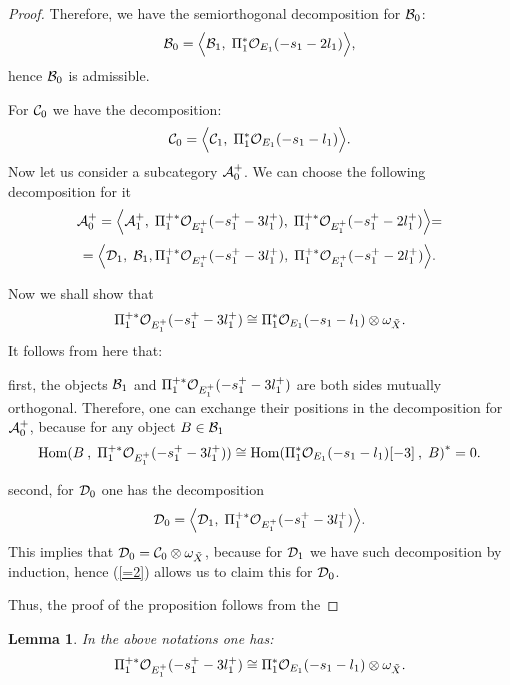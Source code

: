\documentclass[12pt]{article}
\newtheorem{lemma}[theorem]{Lemma}
\def\h#1,#2{{\rm Hom}({#1}\:,\; {#2})}
\def\o#1{{\cal O}_{#1}}
\begin{document}
\begin{proof}
Therefore, we have the semiorthogonal decomposition for ${\cal B}_0$:
$$
{\cal B}_0=\Bigl\langle {\cal B}_1,\; \Pi^*_1{\o {E_1}}(-s_1-2l_1) \Bigl\rangle,
$$
hence ${\cal B}_0$ is admissible.

For ${\cal C}_0$ we have the decomposition:
$$
{\cal C}_0=\Bigl\langle {\cal C}_1,\; \Pi^*_1{\o {E_1}}(-s_1-l_1)\Bigl\rangle.
$$
Now let us consider a subcategory ${\cal A}_0^+$. We can choose the following decomposition for it
$$
{\cal A}_0^+=\Bigl\langle {\cal A}_1^+,\; \Pi^{+*}_1{\o {E_1^+}}(-s_1^+-3l_1^+),\; \Pi^{+*}_1{\o {E_1^+}}(-s_1^+-2l_1^+)\Bigl\rangle=
$$
$$
=\Bigl\langle {\cal D}_1,\; {\cal B}_1, \Pi^{+*}_1{\o {E_1^+}}(-s_1^+-3l_1^+),\; \Pi^{+*}_1{\o {E_1^+}}(-s_1^+-2l_1^+)\Bigl\rangle.
$$

Now we shall show that
\begin{equation}\label{=2}
\Pi^{+*}_1{\o {E_1^+}}(-s_1^+-3l_1^+)\cong \Pi^*_1{\o {E_1}}(-s_1-l_1)\otimes\omega_{\tilde X}.
\end{equation}
It follows from here that:

first, the objects ${\cal B}_1$ and $\Pi^{+*}_1{\o {E_1^+}}(-s_1^+-3l_1^+)$ are both sides mutually orthogonal.
Therefore, one can exchange their positions in the decomposition for ${\cal A}_0^+$, because for any object $B\in{\cal B}_1$
$$
{\h B, {\Pi^{+*}_1{\o {E_1^+}}(-s_1^+-3l_1^+)}}\cong{\h {\Pi^*_1{\o {E_1}}(-s_1-l_1)[-3]}, B}^*=0.
$$

second, for ${\cal D}_0$ one has the decomposition
$$ 
{\cal D}_0=\Bigl\langle {\cal D}_1,\;  \Pi^{+*}_1{\o {E_1^+}}(-s_1^+-3l_1^+)\Bigl\rangle.
$$
This implies that ${\cal D}_0={\cal C}_0\otimes\omega_{\tilde X}$, because for ${\cal D}_1$ we have such decomposition by induction, hence (\ref{=2}) allows us to claim this for ${\cal D}_0$.

Thus, the proof of the proposition follows from the
\end{proof}
\begin{lemma}\label{congr}
In the above notations one has:
$$
\Pi^{+*}_1{\o {E_1^+}}(-s_1^+-3l_1^+)\cong \Pi^*_1{\o {E_1}}(-s_1-l_1)\otimes\omega_{\tilde X}.
$$
\end{lemma}
\end{document}
